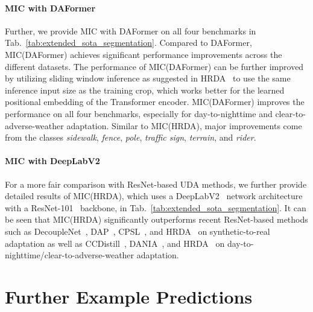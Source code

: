 \documentclass[10pt,twocolumn,letterpaper]{article}
\begin{document}
\paragraph{MIC with DAFormer}
Further, we provide MIC with DAFormer on all four benchmarks in Tab.~\ref{tab:extended_sota_segmentation}. Compared to DAFormer, MIC(DAFormer) achieves significant performance improvements across the different datasets. The performance of MIC(DAFormer) can be further improved by utilizing sliding window inference as suggested in HRDA~\cite{hoyer2022hrda} to use the same inference input size as the training crop, which works better for the learned positional embedding of the Transformer encoder. MIC(DAFormer) improves the performance on all four benchmarks, especially for day-to-nighttime and clear-to-adverse-weather adaptation.
Similar to MIC(HRDA), major improvements come from the classes \emph{sidewalk}, \emph{fence}, \emph{pole}, \emph{traffic sign}, \emph{terrain}, and \emph{rider}.

\paragraph{MIC with DeepLabV2}
For a more fair comparison with ResNet-based UDA methods, we further provide detailed results of MIC(HRDA), which uses a DeepLabV2~\cite{chen2017deeplab} network architecture with a ResNet-101~\cite{he2016deep} backbone, in Tab.~\ref{tab:extended_sota_segmentation}. It can be seen that MIC(HRDA) significantly outperforms recent ResNet-based methods such as DecoupleNet~\cite{lai2022decouplenet}, DAP~\cite{huo2022domain}, CPSL~\cite{li2022class}, and HRDA~\cite{hoyer2022hrda} on synthetic-to-real adaptation as well as CCDistill~\cite{gao2022cross}, DANIA~\cite{wu2021one}, and HRDA~\cite{hoyer2022hrda} on day-to-nighttime/clear-to-adverse-weather adaptation.









\section{Further Example Predictions}
\label{sec:supp_examples}
\end{document}
